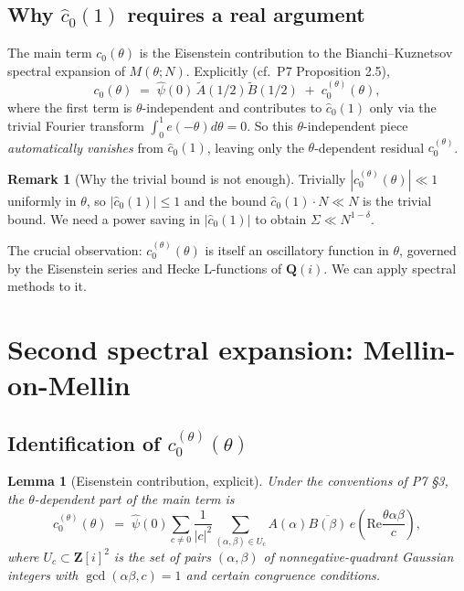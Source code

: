 \documentclass[11pt]{article}
\newtheorem{lemma}[theorem]{Lemma}
\theoremstyle{definition}
\newtheorem{remark}[theorem]{Remark}
\newcommand{\Z}{\mathbf{Z}}
\newcommand{\Q}{\mathbf{Q}}
\newcommand{\Zi}{\Z[i]}
\renewcommand{\Re}{\mathrm{Re}}
\begin{document}
\subsection{Why $\widehat c_0(1)$ requires a real argument}

The main term $c_0(\theta)$ is the Eisenstein contribution to the Bianchi--Kuznetsov spectral expansion of $M(\theta;N)$. Explicitly (cf.\ P7 Proposition 2.5),
\[
c_0(\theta)\;=\;\widehat\psi(0)\,\widetilde A(1/2)\widetilde B(1/2)\;+\;c_0^{(\theta)}(\theta),
\]
where the first term is $\theta$-independent and contributes to $\widehat c_0(1)$ only via the trivial Fourier transform $\int_0^1 e(-\theta)d\theta=0$. So this $\theta$-independent piece \emph{automatically vanishes} from $\widehat c_0(1)$, leaving only the $\theta$-dependent residual $c_0^{(\theta)}$.

\begin{remark}[Why the trivial bound is not enough]\label{rem:why-not-trivial}
Trivially $|c_0^{(\theta)}(\theta)|\ll 1$ uniformly in $\theta$, so $|\widehat c_0(1)|\le 1$ and the bound $\widehat c_0(1)\cdot N\ll N$ is the trivial bound. We need a power saving in $|\widehat c_0(1)|$ to obtain $\Sigma\ll N^{1-\delta}$.
\end{remark}

The crucial observation: $c_0^{(\theta)}(\theta)$ is itself an oscillatory function in $\theta$, governed by the Eisenstein series and Hecke L-functions of $\Q(i)$. We can apply spectral methods to it.

\section{Second spectral expansion: Mellin-on-Mellin}\label{sec:second-spectral}

\subsection{Identification of $c_0^{(\theta)}(\theta)$}

\begin{lemma}[Eisenstein contribution, explicit]\label{lem:eisenstein-explicit}
Under the conventions of P7 §3, the $\theta$-dependent part of the main term is
\[
c_0^{(\theta)}(\theta)\;=\;\widehat\psi(0)\sum_{c\ne 0}\frac{1}{|c|^2}\sum_{(\alpha,\beta)\in U_c}A(\alpha)\overline{B(\beta)}\,e\!\left(\Re\frac{\theta\alpha\beta}{c}\right),
\]
where $U_c\subset\Zi^2$ is the set of pairs $(\alpha,\beta)$ of nonnegative-quadrant Gaussian integers with $\gcd(\alpha\beta,c)=1$ and certain congruence conditions.
\end{lemma}
\end{document}
